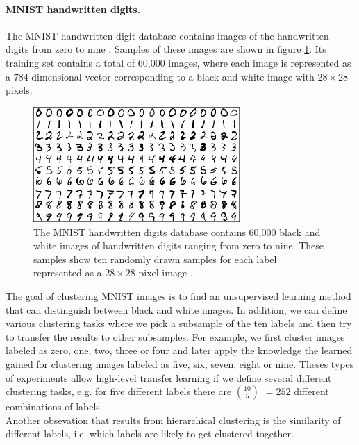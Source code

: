 \paragraph{MNIST handwritten digits.} The MNIST handwritten digit database contains images of the handwritten digits from zero to nine \cite{lecun-mnisthandwrittendigit-2010}. Samples of these images are shown in figure \ref{fig:mnist}. Its training set contains a total of 60,000 images, where each image is represented as a 784-dimensional vector corresponding to a black and white image with $28 \times 28$ pixels.

\begin{figure}[h]
    \centering
    \includegraphics[width=0.7\textwidth]{images/mnist}
    \caption{The MNIST handwritten digits database contains 60,000 black and white images of handwritten digits ranging from zero to nine. These samples show ten randomly drawn samples for each label represented as a $28 \times 28$ pixel image \cite{lecun-mnisthandwrittendigit-2010}.}
    \label{fig:mnist}
\end{figure}

The goal of clustering MNIST images is to find an unsupervised learning method that can distinguish between black and white images. In addition, we can define various clustering tasks where we pick a subsample of the ten labels and then try to transfer the results to other subsamples. For example, we first cluster images labeled as zero, one, two, three or four and later apply the knowledge the learned gained for clustering images labeled as five, six, seven, eight or nine. Theses types of experiments allow high-level transfer learning if we define several different clustering tasks, e.g. for five different labels there are $10 \choose 5$ $= 252$ different combinations of labels.\\

Another obsevation that results from hierarchical clustering is the similarity of different labels, i.e. which labels are likely to get clustered together.

